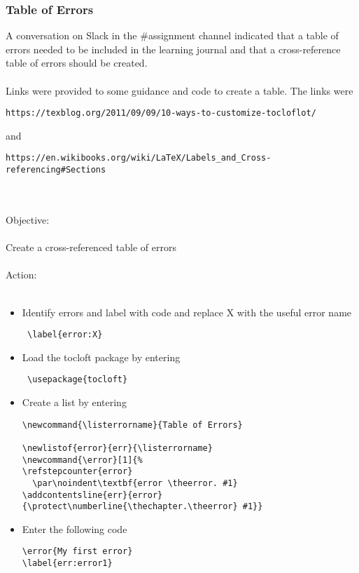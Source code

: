 \documentclass{article}
\begin{document}
\subsubsection*{Table of Errors}\label{sec: Customlist}
A conversation on Slack in the \#assignment channel indicated that a table of errors needed to be included in the learning journal and that a cross-reference table of errors should be created.\\\\
Links were provided to some guidance and code to create a table. The links were \begin{verbatim}
https://texblog.org/2011/09/09/10-ways-to-customize-tocloflot/\end{verbatim} and \begin{verbatim}https://en.wikibooks.org/wiki/LaTeX/Labels_and_Cross-referencing#Sections\end{verbatim}\\\\
Objective:\\\\
Create a cross-referenced table of errors\\\\
Action:\\\\
\begin{itemize}
    \item Identify errors and label with code and replace X with the useful error name \begin{verbatim} \label{error:X}    \end{verbatim} 
    \item Load the tocloft package by entering \begin{verbatim} \usepackage{tocloft}\end{verbatim} 
    \item Create a list by entering \begin{verbatim}\newcommand{\listerrorname}{Table of Errors}

\newlistof{error}{err}{\listerrorname}
\newcommand{\error}[1]{%
\refstepcounter{error}
  \par\noindent\textbf{error \theerror. #1}
\addcontentsline{err}{error}
{\protect\numberline{\thechapter.\theerror} #1}}\end{verbatim} 
\item Enter the following code \begin{verbatim}
\error{My first error}
\label{err:error1}
\end{verbatim} 
\end{itemize}
\end{document}
